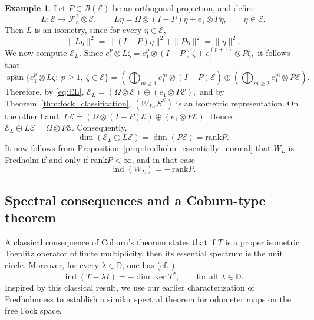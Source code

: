 \documentclass[12pt]{amsart}
\theoremstyle{definition}
\newtheorem{example}[theorem]{Example}
\theoremstyle{remark}
\def \D{\mathbb{D}}
\newcommand{\clb}{\mathcal{B}}
\newcommand{\cle}{\mathcal{E}}
\newcommand{\clf}{\mathcal{F}}
\newcommand{\rank}{\mathrm{rank}}
\newcommand{\ind}{\operatorname{ind}}
\numberwithin{equation}{section}
\begin{document}
\begin{example}\label{ex:projection_fredholm}
Let $P\in\clb(\cle)$ be an orthogonal projection, and define
\[
L:\cle\to \clf_n^2\otimes \cle,
\qquad
L\eta=\Omega\otimes (I-P)\eta+e_1\otimes P\eta,
\qquad \eta\in\cle.
\]
Then $L$ is an isometry, since for every $\eta\in\cle$,
\[
\|L\eta\|^2
=
\|(I-P)\eta\|^2+\|P\eta\|^2
=
\|\eta\|^2.
\]
We now compute $\cle_L$. 
Since $e_1^{ p}\otimes L\zeta
=
e_1^{p}\otimes (I-P)\zeta
+
e_1^{(p+1)}\otimes P\zeta,$
it follows that
\[
\overline{\operatorname{span}}\{e_1^{p}\otimes L\zeta:\ p\ge1,\ \zeta\in\cle\}
=
\left(\bigoplus_{m\ge1} e_1^{ m}\otimes (I-P)\cle\right)
\oplus
\left(\bigoplus_{m\ge2} e_1^{ m}\otimes P\cle\right).
\]
Therefore, by \eqref{eq:EL}, $\cle_L=(\Omega\otimes \cle)\oplus (e_1\otimes P\cle),$ and by Theorem~\ref{thm:fock_classification}, $(W_L,S^\cle)$ is an isometric representation.
On the other hand, $L\cle=(\Omega\otimes (I-P)\cle)\oplus (e_1\otimes P\cle).$
Hence $\cle_L\ominus L\cle=\Omega\otimes P\cle.$
Consequently,
\[
\dim(\cle_L\ominus L\cle)=\dim(P\cle)=\rank P.
\]
It now follows from Proposition~\ref{prop:fredholm_essentially_normal} that $W_L$ is Fredholm if and only if $\rank P<\infty$, and in that case
\[
\ind(W_L)=-\,\rank P.
\]
\end{example}


\subsection{Spectral consequences and a Coburn-type theorem}\label{sec:coburn_type}
A classical consequence of Coburn's theorem states that if $T$ is a proper isometric Toeplitz operator of finite multiplicity, then its essential spectrum is the unit circle. Moreover, for every \(\lambda\in\D\), one has  (cf. \cite{coburn1966}):
\[
\ind(T-\lambda I) = -\dim\ker T^*, \qquad \text{for all } \lambda \in \D.
\]
Inspired by this classical result, we use our earlier characterization of Fredholmness to establish a similar spectral theorem for odometer maps on the free Fock space.
\end{document}
